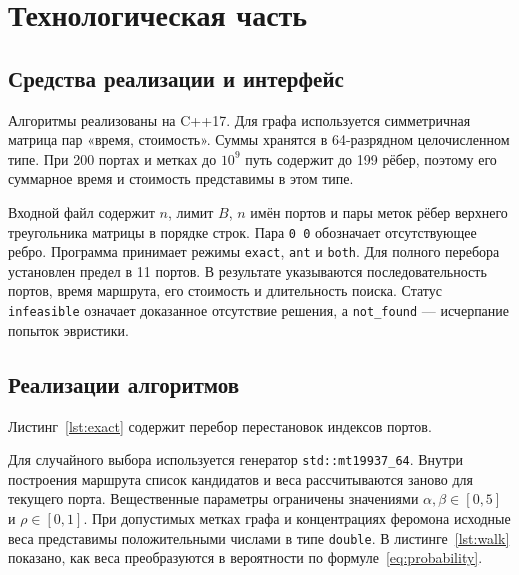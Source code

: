 \clearpage
\section{Технологическая часть}

\subsection{Средства реализации и интерфейс}

Алгоритмы реализованы на C++17. Для графа используется симметричная матрица пар «время, стоимость». Суммы хранятся в 64-разрядном целочисленном типе. При 200 портах и метках до $10^9$ путь содержит до 199 рёбер, поэтому его суммарное время и стоимость представимы в этом типе.

Входной файл содержит $n$, лимит $B$, $n$ имён портов и пары меток рёбер верхнего треугольника матрицы в порядке строк. Пара \texttt{0 0} обозначает отсутствующее ребро. Программа принимает режимы \texttt{exact}, \texttt{ant} и \texttt{both}. Для полного перебора установлен предел в 11 портов. В результате указываются последовательность портов, время маршрута, его стоимость и длительность поиска. Статус \texttt{infeasible} означает доказанное отсутствие решения, а \texttt{not\_found} --- исчерпание попыток эвристики.

\subsection{Реализации алгоритмов}

Листинг~\ref{lst:exact} содержит перебор перестановок индексов портов.



\clearpage
Для случайного выбора используется генератор \texttt{std::mt19937\_64}. Внутри построения маршрута список кандидатов и веса рассчитываются заново для текущего порта. Вещественные параметры ограничены значениями $\alpha,\beta\in[0,5]$ и $\rho\in[0,1]$. При допустимых метках графа и концентрациях феромона исходные веса представимы положительными числами в типе \texttt{double}. В листинге~\ref{lst:walk} показано, как веса преобразуются в вероятности по формуле~\eqref{eq:probability}.



